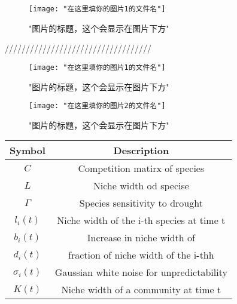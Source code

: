 \begin{figure}[H]
	\texttt{[image: "在这里填你的图片1的文件名"]}
	\centering
	\label{"可以和caption保持一致，也可以不写"}
	\caption{"图片的标题，这个会显示在图片下方"}
	\centering
\end{figure}
///////////////////////////////////
\begin{figure}[H]
	\begin{minipage}{0.5\textwidth}
		\texttt{[image: "在这里填你的图片1的文件名"]}
		\caption{"图片的标题，这个会显示在图片下方"}
		\label{"可以和caption保持一致，也可以不写"}
	\end{minipage}
	\hfill
	\begin{minipage}{0.5\textwidth}
		\texttt{[image: "在这里填你的图片2的文件名"]}
		\caption{"图片的标题，这个会显示在图片下方"}
		\label{"可以和caption保持一致，也可以不写"}
	\end{minipage}
\end{figure}
\begin{table}[h]%
	\centering%
	\renewcommand\arraystretch{1.5}%
	\tabcolsep=1.5cm%
	\begin{tabular}{@{}cclll@{}}
		\toprule[1.5pt]
		\textbf{Symbol}               & \multicolumn{4}{c}{\textbf{Description}}                      \\
		\midrule[1pt]
		$C$                           & \multicolumn{4}{c}{Competition matirx of species}             \\
		$L$                           & \multicolumn{4}{c}{Niche width od specise}                    \\
		$\Gamma $                     & \multicolumn{4}{c}{Species sensitivity to drought}            \\
		${l_i}\left( t \right)$       & \multicolumn{4}{c}{Niche width of the i-th species at time t} \\
		${b_i}\left( t \right)$       & \multicolumn{4}{c}{Increase in niche width of }               \\
		${d_i}\left( t \right)$       & \multicolumn{4}{c}{fraction of niche width of the i-thh}      \\
		${\sigma _i}\left( t \right)$ & \multicolumn{4}{c}{Gaussian white noise for unpredictability} \\
		$K\left( t \right)$           & \multicolumn{4}{c}{Niche width of a community at time t}      \\
		\bottomrule[1.5pt]
	\end{tabular}
\end{table}